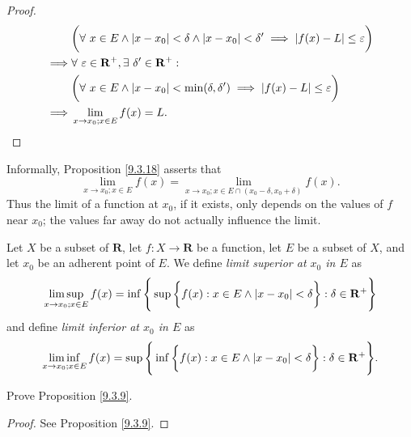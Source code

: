\begin{proof}
\begin{align*}
                 & \bigg(\forall\ x \in E \land \abs*{x - x_0} < \delta \land \abs*{x - x_0} < \delta' \implies \abs*{f(x) - L} \leq \varepsilon\bigg)            \\
        \implies & \forall\ \varepsilon \in \mathbf{R}^+, \exists\ \delta' \in \mathbf{R}^+ :                                                                     \\
                 & \bigg(\forall\ x \in E \land \abs*{x - x_0} < \min(\delta, \delta') \implies \abs*{f(x) - L} \leq \varepsilon\bigg)                            \\
        \implies & \lim_{x \to x_0 ; x \in E} f(x) = L.
    \end{align*}
\end{proof}

\begin{note}
    Informally, Proposition \ref{9.3.18} asserts that
    \[
        \lim_{x \to x_0 ; x \in E} f(x) = \lim_{x \to x_0 ; x \in E \cap (x_0 - \delta, x_0 + \delta)} f(x).
    \]
    Thus the limit of a function at \(x_0\), if it exists, only depends on the values of \(f\) near \(x_0\);
    the values far away do not actually influence the limit.
\end{note}

\setcounter{theorem}{21}
\begin{definition}\label{9.3.22}
    Let \(X\) be a subset of \(\mathbf{R}\), let \(f : X \to \mathbf{R}\) be a function, let \(E\) be a subset of \(X\), and let \(x_0\) be an adherent point of \(E\).
    We define \emph{limit superior at \(x_0\) in \(E\)} as
    \[
        \limsup_{x \to x_0 ; x \in E} f(x) = \inf\Bigg\{\sup\bigg\{f(x) : x \in E \land \abs*{x - x_0} < \delta\bigg\} : \delta \in \mathbf{R}^+\Bigg\}
    \]
    and define \emph{limit inferior at \(x_0\) in \(E\)} as
    \[
        \liminf_{x \to x_0 ; x \in E} f(x) = \sup\Bigg\{\inf\bigg\{f(x) : x \in E \land \abs*{x - x_0} < \delta\bigg\} : \delta \in \mathbf{R}^+\Bigg\}.
    \]
\end{definition}

\exercisesection

\begin{exercise}\label{ex 9.3.1}
    Prove Proposition \ref{9.3.9}.
\end{exercise}

\begin{proof}
    See Proposition \ref{9.3.9}.
\end{proof}

